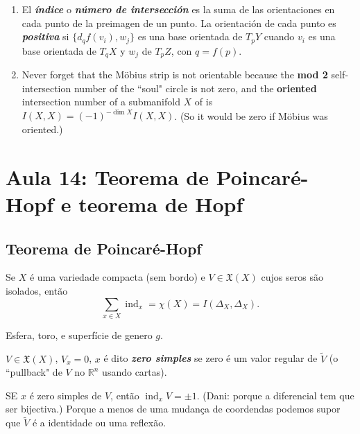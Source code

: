 \begin{enumerate}
\item El \textit{\textbf{índice}} o \textit{\textbf{número de intersección}} es la suma de las orientaciones en cada punto de la preimagen de un punto. La orientación de cada punto es \textit{\textbf{positiva}} si \(\{d_{q}f(v_i),w_j\}\) es una base orientada de \(T_pY\) cuando \(v_i\) es una base orientada de \(T_qX\) y \(w_j\) de \(T_pZ\), con  \(q=f(p)\).

\item Never forget that the Möbius strip is not orientable because the \textbf{mod 2} self-intersection number of the ``soul" circle is not zero, and the \textbf{oriented} intersection number of a submanifold \(X\) of is \(I(X,X)=(-1)^{-\dim X}I(X,X)\). (So it would be zero if Möbius was oriented.)
\end{enumerate}
\section{Aula 14: Teorema de Poincaré-Hopf e teorema de Hopf}

\subsection{Teorema de Poincaré-Hopf}

\begin{thm}\leavevmode
Se \(X\) é uma variedade compacta (sem bordo) e \(V \in \mathfrak{X}(X)\) cujos seros são isolados, então
\[\sum_{x \in X} \operatorname{ind}_x=\chi(X)=I(\Delta_X,\Delta_X).\]
\end{thm}

\begin{example}\leavevmode
Esfera, toro, e superfície de genero \(g\).
\end{example}

\begin{remark}\leavevmode
\(V \in \mathfrak{X}(X)\), \(V_x=0\), \(x\) é dito \textit{\textbf{zero simples}} se zero é um valor regular de \(\tilde{V}\) (o ``pullback" de \(V\) no \(\mathbb{R}^n\) usando cartas). 
\end{remark}

\begin{remark}\leavevmode
SE \(x\) é zero simples de \(V\), então \(\operatorname{ind}_x V=\pm 1\). (Dani: porque a diferencial tem que ser bijectiva.) Porque a menos de uma mudança de coordendas podemos supor que \(\tilde{V}\) é a identidade ou uma reflexão.
\end{remark}

